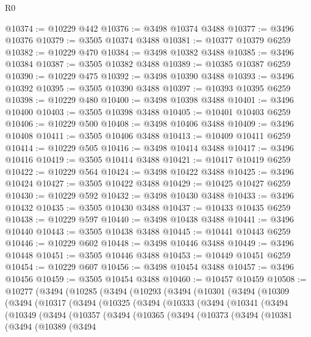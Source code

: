 \begin{lexlean}{R0}
\begin{coremodule}
@10374 := @10229 @442
@10376 := @3498 @10374 @3488
@10377 := @3496 @10376
@10379 := @3505 @10374 @3488
@10381 := @10377 @10379 @6259
@10382 := @10229 @470
@10384 := @3498 @10382 @3488
@10385 := @3496 @10384
@10387 := @3505 @10382 @3488
@10389 := @10385 @10387 @6259
@10390 := @10229 @475
@10392 := @3498 @10390 @3488
@10393 := @3496 @10392
@10395 := @3505 @10390 @3488
@10397 := @10393 @10395 @6259
@10398 := @10229 @480
@10400 := @3498 @10398 @3488
@10401 := @3496 @10400
@10403 := @3505 @10398 @3488
@10405 := @10401 @10403 @6259
@10406 := @10229 @500
@10408 := @3498 @10406 @3488
@10409 := @3496 @10408
@10411 := @3505 @10406 @3488
@10413 := @10409 @10411 @6259
@10414 := @10229 @505
@10416 := @3498 @10414 @3488
@10417 := @3496 @10416
@10419 := @3505 @10414 @3488
@10421 := @10417 @10419 @6259
@10422 := @10229 @564
@10424 := @3498 @10422 @3488
@10425 := @3496 @10424
@10427 := @3505 @10422 @3488
@10429 := @10425 @10427 @6259
@10430 := @10229 @592
@10432 := @3498 @10430 @3488
@10433 := @3496 @10432
@10435 := @3505 @10430 @3488
@10437 := @10433 @10435 @6259
@10438 := @10229 @597
@10440 := @3498 @10438 @3488
@10441 := @3496 @10440
@10443 := @3505 @10438 @3488
@10445 := @10441 @10443 @6259
@10446 := @10229 @602
@10448 := @3498 @10446 @3488
@10449 := @3496 @10448
@10451 := @3505 @10446 @3488
@10453 := @10449 @10451 @6259
@10454 := @10229 @607
@10456 := @3498 @10454 @3488
@10457 := @3496 @10456
@10459 := @3505 @10454 @3488
@10460 := @10457 @10459
@10508 := @10277
    (@3494
      (@10285
        (@3494
          (@10293
            (@3494
              (@10301
                (@3494
                  (@10309
                    (@3494
                      (@10317
                        (@3494
                          (@10325
                            (@3494
                              (@10333
                                (@3494
                                  (@10341
                                    (@3494
                                      (@10349
                                        (@3494
                                          (@10357
                                            (@3494
                                              (@10365
                                                (@3494
                                                  (@10373
                                                    (@3494
                                                      (@10381
                                                        (@3494
                                                          (@10389
                                                            (@3494

\end{coremodule}
\end{lexlean}
